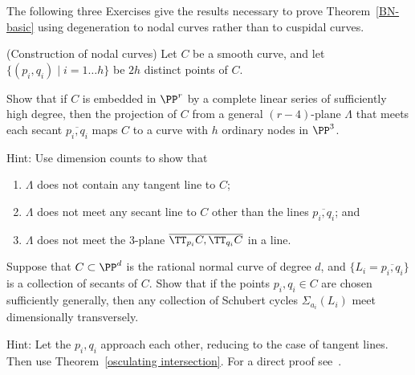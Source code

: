 The following three Exercises give the results necessary to prove Theorem~\ref{BN-basic} using degeneration to
nodal curves rather than to cuspidal curves. 

\begin{exercise}\label{independent secants}\label{Constructing nodal curves} (Construction of nodal curves) Let $C$ be a smooth curve,
and let
 $\{(p_{i}, q_{i}) \mid i = 1\dots h\}$ be $2h$ distinct points of $C$.
 
Show that if $C$ is embedded in $\PP^{r}$ by a complete linear series of sufficiently high degree, then the
projection of $C$ from a general $(r-4)$-plane $\Lambda$ that meets each secant $\overline{p_{i}, q_{i}}$
maps $C$ to a curve with $h$ ordinary nodes in $\PP^{3}$.

Hint: Use dimension counts to show that
\begin{enumerate}
\item $\Lambda$ does not contain any tangent line to $C$;
\item $\Lambda$ does not meet any secant line to $C$ other than the lines  $\overline{p_{i}, q_{i}}$; and
\item $\Lambda$ does not meet the 3-plane $\overline{\TT_{p_i}C, \TT_{q_i}C}$ in a line.
\end{enumerate}
 \end{exercise}

\begin{exercise}\label{BN via nodal curves}\label{secant general position}
Suppose that $C\subset \PP^{d}$ is the rational normal curve of degree $d$, and $\{L_{i} = \overline{p_{i},q_{i}}\}$
is a collection of secants of $C$. Show that if the points $p_{i}, q_{i}\in C$ are chosen sufficiently generally,
then any collection of Schubert cycles $\Sigma_{a_{i}}(L_{i})$ meet dimensionally transversely.

Hint: Let the $p_{i}, q_{i}$ approach each other, reducing to the case of tangent lines. Then use
Theorem~\ref{osculating intersection}. For a direct proof see~\cite[Lemma, p. 259]{Griffiths-Harris-BN}.
\end{exercise}

